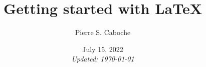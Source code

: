 
\title{Getting started with \LaTeX}
\author{Pierre S. Caboche}

\date{
	July 15, 2022 \\                    %
	\medskip 
	\footnotesize \emph{Updated: \today}  %
}
